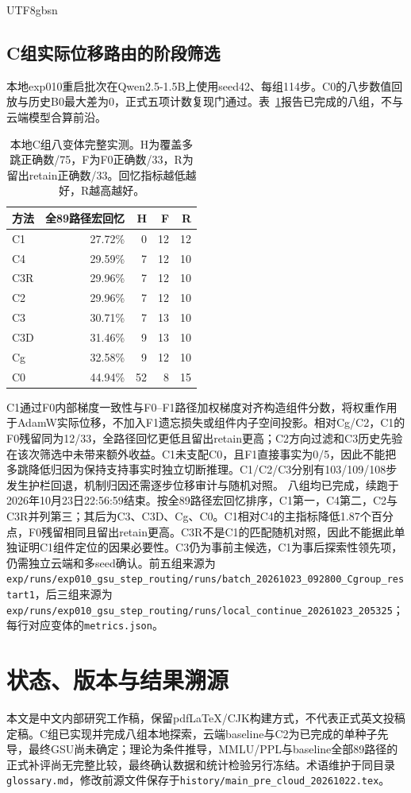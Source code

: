 \documentclass[sigconf,anonymous,review]{acmart}
\begin{document}
\begin{CJK*}{UTF8}{gbsn}
\subsection{C组实际位移路由的阶段筛选}
本地exp010重启批次在Qwen2.5-1.5B上使用seed42、每组114步。C0的八步数值回放与历史B0最大差为0，正式五项计数复现门通过。表~\ref{tab:localcpartial}报告已完成的八组，不与云端模型合算前沿。
\begin{table}[ht]
\caption{本地C组八变体完整实测。H为覆盖多跳正确数/75，F为F0正确数/33，R为留出retain正确数/33。回忆指标越低越好，R越高越好。}
\label{tab:localcpartial}
\centering\small
\begin{tabular}{lrrrr}
\toprule
方法 & 全89路径宏回忆 & H & F & R\\
\midrule
C1 & 27.72\% & 0 & 12 & 12\\
C4 & 29.59\% & 7 & 12 & 10\\
C3R & 29.96\% & 7 & 12 & 10\\
C2 & 29.96\% & 7 & 12 & 10\\
C3 & 30.71\% & 7 & 13 & 10\\
C3D & 31.46\% & 9 & 13 & 10\\
Cg & 32.58\% & 9 & 12 & 10\\
C0 & 44.94\% & 52 & 8 & 15\\
\bottomrule
\end{tabular}
\end{table}
C1通过F0内部梯度一致性与F0--F1路径加权梯度对齐构造组件分数，将权重作用于AdamW实际位移，不加入F1遗忘损失或组件内子空间投影。相对Cg/C2，C1的F0残留同为12/33，全路径回忆更低且留出retain更高；C2方向过滤和C3历史先验在该次筛选中未带来额外收益。C1未支配C0，且F1直接事实为0/5，因此不能把多跳降低归因为保持支持事实时独立切断推理。C1/C2/C3分别有103/109/108步发生护栏回退，机制归因还需逐步位移审计与随机对照。
八组均已完成，续跑于2026年10月23日22:56:59结束。按全89路径宏回忆排序，C1第一，C4第二，C2与C3R并列第三；其后为C3、C3D、Cg、C0。C1相对C4的主指标降低1.87个百分点，F0残留相同且留出retain更高。C3R不是C1的匹配随机对照，因此不能据此单独证明C1组件定位的因果必要性。C3仍为事前主候选，C1为事后探索性领先项，仍需独立云端和多seed确认。前五组来源为\nolinkurl{exp/runs/exp010_gsu_step_routing/runs/batch_20261023_092800_Cgroup_restart1}，后三组来源为\nolinkurl{exp/runs/exp010_gsu_step_routing/runs/local_continue_20261023_205325}；每行对应变体的\nolinkurl{metrics.json}。

\section{状态、版本与结果溯源}
本文是中文内部研究工作稿，保留pdfLaTeX/CJK构建方式，不代表正式英文投稿定稿。C组已实现并完成八组本地探索，云端baseline与C2为已完成的单种子先导，最终GSU尚未确定；理论为条件推导，MMLU/PPL与baseline全部89路径的正式补评尚无完整比较，最终确认数据和统计检验另行冻结。术语维护于同目录\nolinkurl{glossary.md}，修改前源文件保存于\nolinkurl{history/main_pre_cloud_20261022.tex}。


\end{CJK*}
\end{document}
